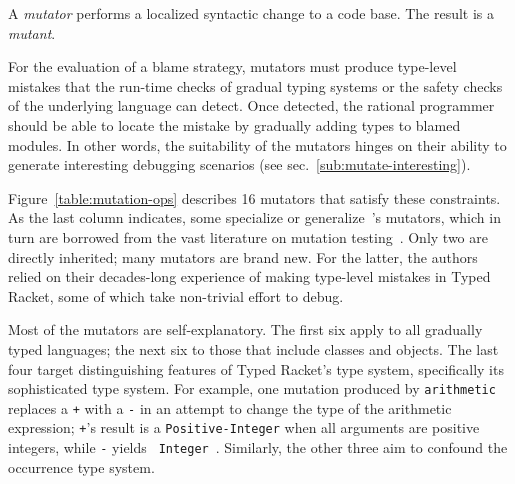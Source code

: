 
A {\it mutator\/} performs a localized syntactic change to a code base. The
result is a {\em mutant\/}.

For the evaluation of a blame strategy, mutators must produce type-level
mistakes that the run-time checks of gradual typing systems or the safety
checks of the underlying language can detect. Once detected, the rational
programmer should be able to locate the mistake by gradually adding types
to blamed modules. In other words, the suitability of the mutators hinges
on their ability to generate interesting debugging scenarios (see
sec.~\ref{sub:mutate-interesting}).


Figure~\ref{table:mutation-ops} describes 16 mutators that satisfy these
constraints. As the last column indicates, some specialize or
generalize~\citet{lksfd-popl-2020}'s mutators, which in turn are borrowed from
the vast literature on mutation testing~\citep{jia2011analysis}.  Only two are
directly inherited; many mutators are brand new. For the latter, the authors
relied on their decades-long experience of making type-level mistakes in Typed
Racket, some of which take non-trivial effort to debug.

Most of the mutators are self-explanatory.  The first six apply to all
gradually typed languages; the next six to those that include classes and
objects. The last four target distinguishing features of Typed
Racket's type system,
specifically its sophisticated type system. For example, one mutation produced by {\tt arithmetic}
replaces a {\tt +} with a {\tt -} in an attempt to change the type of the
arithmetic expression; {\tt +}'s result is a {\tt Positive-Integer} when all
arguments are positive integers, while {\tt -} yields {\tt
Integer}~\citep{stathff-padl-12}. Similarly, the other three aim to confound
the occurrence type system. 

